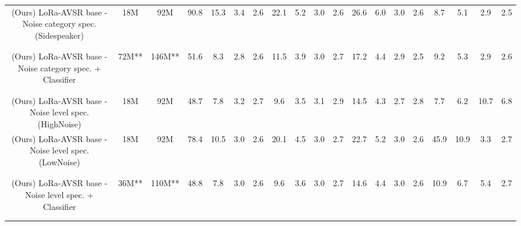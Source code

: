 \begin{table*}[ht]
{\begin{tabular}{c|cc|cccc|cccc|cccc|cccc}
(Ours) LoRa-AVSR base - Noise category spec. (Sidespeaker) & 
18M & 92M & 90.8 & 15.3 & 3.4 & 2.6 & 22.1 & 5.2 & 3.0 & 2.6 & 26.6 & 6.0 & 3.0 & 2.6 & \cellcolor{gray!20}8.7 & \cellcolor{gray!20}5.1 & \cellcolor{gray!20}2.9 & \cellcolor{gray!20}2.5 \\

\\[-0.85em]
\hdashline
\\[-0.85em]

(Ours) LoRa-AVSR base - Noise category spec. + Classifier  & 
72M** & 146M** & \cellcolor{green!15}51.6 & \cellcolor{green!15}8.3 & \cellcolor{green!15}2.8 & \cellcolor{green!15}2.6 & \cellcolor{green!15}11.5 & \cellcolor{green!15}3.9 & \cellcolor{green!15}3.0 & \cellcolor{green!15}2.7 & \cellcolor{green!15}17.2 & \cellcolor{green!15}4.4 & \cellcolor{green!15}2.9 & \cellcolor{green!15}2.5 & \cellcolor{green!15}9.2 & \cellcolor{green!15}5.3 & \cellcolor{green!15}2.9 & \cellcolor{green!15}2.6 \\


\\[-0.6em]
\hline
\\[-0.6em]

(Ours) LoRa-AVSR base - Noise level spec. (HighNoise) & 
18M & 92M & \cellcolor{gray!20}48.7 & \cellcolor{gray!20}7.8 & 3.2 & 2.7 & \cellcolor{gray!20}9.6 & \cellcolor{gray!20}3.5 & 3.1 & 2.9 & \cellcolor{gray!20}14.5 & \cellcolor{gray!20}4.3 & 2.7 & 2.8 & \cellcolor{gray!20}7.7 & \cellcolor{gray!20}6.2 & 10.7 & 6.8 \\

(Ours) LoRa-AVSR base - Noise level spec. (LowNoise) & 
18M & 92M & 78.4 & 10.5 & \cellcolor{gray!20}3.0 & \cellcolor{gray!20}2.6 & 20.1 & 4.5 & \cellcolor{gray!20}3.0 & \cellcolor{gray!20}2.7 & 22.7 & 5.2 & \cellcolor{gray!20}3.0 & \cellcolor{gray!20}2.6 & 45.9 & 10.9 & \cellcolor{gray!20}3.3 & \cellcolor{gray!20}2.7 \\
\\[-0.85em]
\hdashline
\\[-0.85em]
(Ours) LoRa-AVSR base - Noise level spec. + Classifier & 
36M** & 110M** & \cellcolor{blue!15}48.8 & \cellcolor{blue!15}7.8 & \cellcolor{blue!15}3.0 & \cellcolor{blue!15}2.6 & \cellcolor{blue!15}9.6 & \cellcolor{blue!15}3.6 & \cellcolor{blue!15}3.0 & \cellcolor{blue!15}2.7 & \cellcolor{blue!15}14.6 & \cellcolor{blue!15}4.4 & \cellcolor{blue!15}3.0 & \cellcolor{blue!15}2.6 & \cellcolor{blue!15}10.9 & \cellcolor{blue!15}6.7 & \cellcolor{blue!15}5.4 & \cellcolor{blue!15}2.7 \\
\\[-0.5em]
\hline
\hline
\\[-0.5em]




\end{tabular}}
\end{table*}
